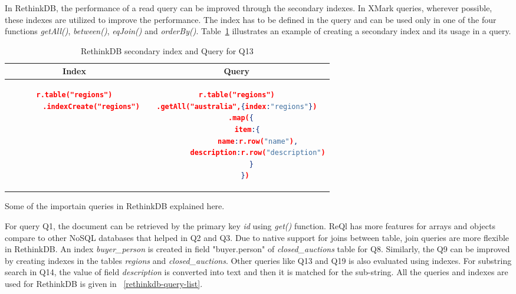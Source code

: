 In RethinkDB, the performance of a read query can be improved through the secondary indexes. In XMark queries,  wherever possible, these indexes are utilized to improve the performance. The index has to be defined in the query and can be used only in one of the four functions \textit{getAll()}, \textit{between()}, \textit{eqJoin()} and \textit{orderBy()}. Table~\ref{tbl:rethinkdb-index-query} illustrates an example of creating a secondary index and its usage in a query.
\begin{longtable}{c|c}
	\caption{ RethinkDB secondary index and Query for Q13}
	\label{tbl:rethinkdb-index-query}\\
    {Index} & {Query}\\
	\hline
\begin{minipage}{.3\textwidth}
\begin{lstlisting}[language=JSON,basicstyle=\scriptsize]
    r.table("regions")
        .indexCreate("regions")
\end{lstlisting}
\end{minipage} &
\begin{minipage}{.5\textwidth}
\begin{lstlisting}[language=JSON,basicstyle=\scriptsize]
r.table("regions")
.getAll("australia",{index:"regions"})
    .map({  
       item:{  
          name:r.row("name"),
          description:r.row("description")
       }
    })
\end{lstlisting}
\end{minipage}
\end{longtable}
Some of the importain queries in RethinkDB explained here.


For query Q1, the document can be retrieved by the primary key \textit{id} using \textit{get()} function.  ReQl has more features for arrays and objects compare to  other NoSQL databases that helped in Q2 and Q3. Due to native support for joins between table, join queries are more flexible in RethinkDB. An index \textit{buyer\_person} is created in field "buyer.person" of \textit{closed\_auctions} table for Q8. Similarly, the Q9 can be improved by creating indexes in the tables \textit{regions} and \textit{closed\_auctions}. Other queries like Q13 and Q19 is also evaluated using indexes. For substring search in Q14, the value of  field \textit{description} is converted into text and then it is matched for the sub-string. All the queries and indexes are used for RethinkDB is given in ~\ref{rethinkdb-query-list}.
